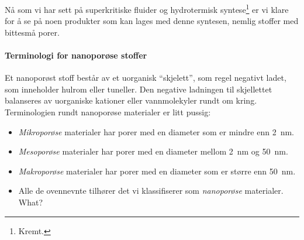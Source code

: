 Nå som vi har sett på superkritiske fluider og hydrotermisk syntese\footnote{Kremt.} er vi klare for å se på noen produkter som kan lages med denne syntesen, nemlig stoffer med bittesmå porer.

\paragraph{Terminologi for nanoporøse stoffer} Et nanoporøst stoff består av et uorganisk ``skjelett'', som regel negativt ladet, som inneholder hulrom eller tuneller. Den negative ladningen til skjellettet balanseres av uorganiske kationer eller vannmolekyler rundt om kring. Terminologien rundt nanoporøse materialer er litt pussig:
\begin{itemize}
	\item \emph{Mikroporøse} materialer har porer med en diameter som er mindre enn \SI{2}{\nano\meter}.
	\item \emph{Mesoporøse} materialer har porer med en diameter mellom \SI{2}{\nano\meter} og \SI{50}{\nano\meter}.
	\item \emph{Makroporøse} materialer har porer med en diameter som er større enn \SI{50}{\nano\meter}.
	\item Alle de ovennevnte tilhører det vi klassifiserer som \emph{nanoporøse} materialer. What?
\end{itemize}

